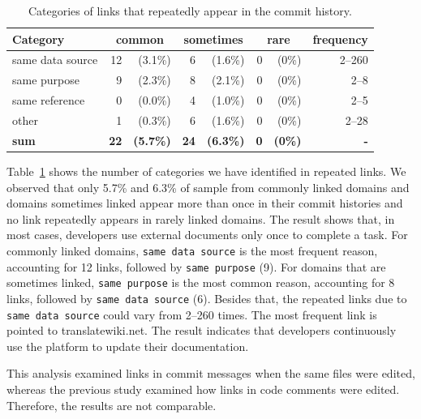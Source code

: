 \documentclass[smallextended]{svjour3}       %
\begin{document}
\begin{table}[t]
\centering
\caption{Categories of links that repeatedly appear in the commit history.}
\label{tab:repeated}      
\begin{tabular}{lr@{}rr@{}rr@{}rr}
\toprule
Category 
&  \multicolumn{2}{c}{\textbf{common}} &  \multicolumn{2}{c}{\textbf{sometimes}} &  \multicolumn{2}{c}{\textbf{rare}} &  
frequency \\
\midrule
same data source    & 12 & (3.1\%) & 6 & (1.6\%) & 0 & (0\%) & 2--260 \\  
same purpose        &  9 & (2.3\%) & 8 & (2.1\%)    & 0 & (0\%) & 2--8 \\
same reference      &  0 & (0.0\%) & 4 & (1.0\%) & 0 & (0\%) & 2--5 \\
other               &  1 & (0.3\%) & 6 & (1.6\%)    & 0 & (0\%) & 2--28 \\
\midrule
\textbf{sum} & \textbf{22} & \textbf{(5.7\%)} & \textbf{24} & \textbf{(6.3\%)} & \textbf{0} & \textbf{(0\%)} & \textbf{-}\\
\bottomrule
\end{tabular}
\end{table}



Table~\ref{tab:repeated} shows the number of categories we have identified in repeated links.
We observed that only 5.7\% and 6.3\% of sample from commonly linked domains and domains sometimes linked appear more than once in their commit histories and no link repeatedly appears in rarely linked domains.
The result shows that, in most cases, developers use external documents only once to complete a task.
For commonly linked domains, \texttt{same data source} is the most frequent reason, accounting for 12 links, followed by \texttt{same purpose} (9). For domains that are sometimes linked, \texttt{same purpose} is the most common reason, accounting for 8 links, followed by \texttt{same data source} (6). 
Besides that, the repeated links due to \texttt{same data source} could vary from 2--260 times. 
The most frequent link is pointed to \textsf{translatewiki.net}. 
The result indicates that developers continuously use the platform to update their documentation.

This analysis examined links in commit messages when the same files were edited, whereas the previous study \citep{hata20199} examined how links in code comments were edited. Therefore, the results are not comparable.
\end{document}
